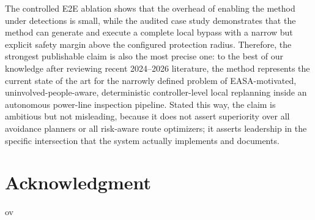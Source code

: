 \documentclass[journal,twoside,web]{ieeecolor}
\begin{document}
The controlled E2E ablation shows that the overhead of enabling the method under detections is small, while the audited case study demonstrates that the method can generate and execute a complete local bypass with a narrow but explicit safety margin above the configured protection radius. Therefore, the strongest publishable claim is also the most precise one: to the best of our knowledge after reviewing recent 2024--2026 literature, the method represents the current state of the art for the narrowly defined problem of EASA-motivated, uninvolved-people-aware, deterministic controller-level local replanning inside an autonomous power-line inspection pipeline. Stated this way, the claim is ambitious but not misleading, because it does not assert superiority over all avoidance planners or all risk-aware route optimizers; it asserts leadership in the specific intersection that the system actually implements and documents.


\section*{Acknowledgment}



ov
\end{document}
